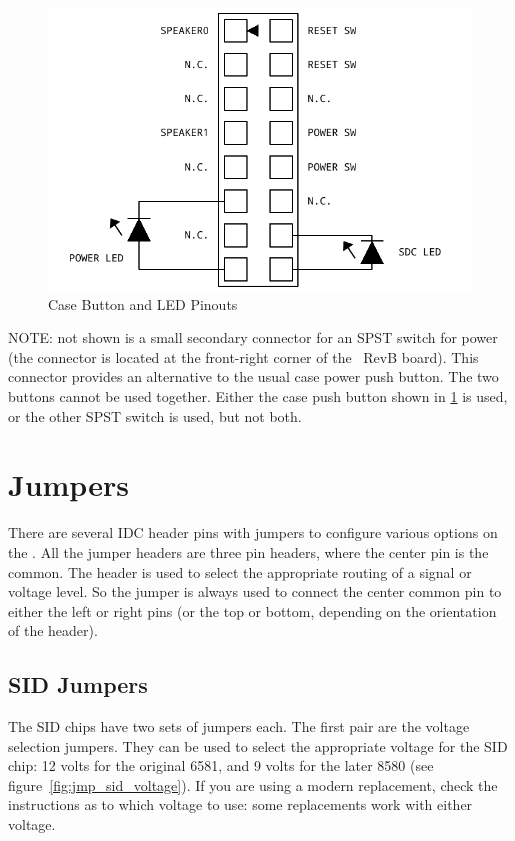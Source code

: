 \begin{figure}[ht]
    \begin{center}
        \includegraphics[scale=0.75]{images/f256_port_case.pdf}
    \end{center}
    \caption{Case Button and LED Pinouts}
    \label{fig:port_case}
\end{figure}

NOTE: not shown is a small secondary connector for an SPST switch for power (the connector is located at the front-right corner of the \jr\ RevB board). This connector provides an alternative to the usual case power push button. The two buttons cannot be used together. Either the case push button shown in \ref{fig:port_case} is used, or the other SPST switch is used, but not both.

\section*{Jumpers}

There are several IDC header pins with jumpers to configure various options on the \jr. All the jumper headers are three pin headers, where the center pin is the common. The header is used to select the appropriate routing of a signal or voltage level. So the jumper is always used to connect the center common pin to either the left or right pins (or the top or bottom, depending on the orientation of the header).

\subsection*{SID Jumpers}

The SID chips have two sets of jumpers each. The first pair are the voltage selection jumpers. They can be used to select the appropriate voltage for the SID chip: 12 volts for the original 6581, and 9 volts for the later 8580 (see figure~\ref{fig:jmp_sid_voltage}). If you are using a modern replacement, check the instructions as to which voltage to use: some replacements work with either voltage.

